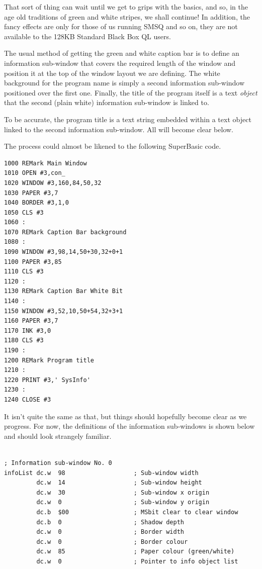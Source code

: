 That sort of thing can wait until we get to grips with the basics, and so, in the
age old traditions of green and white stripes, we shall continue! In addition, the fancy
effects are only for those of us running SMSQ and so on, they are not available to the
128KB Standard Black Box QL users.

The usual method of getting the green and white caption bar is to define an
information sub-{}window that covers the required length of the window and position it at
the top of the window layout we are defining. The white background for the program name is
simply a second information sub-{}window positioned over the first one. Finally, the title
of the program itself is a text \emph{object} that the second (plain white)
information sub-{}window is linked to. 

To be accurate, the program title is a text string embedded within a text object
linked to the second information sub-{}window. All will become clear below.

The process could almost be likened to the following SuperBasic code.

\begin{lstlisting}[firstnumber=1,language={},caption={Pseudo SuperBasic Equivalent},label={lst:PseudoSuperBasicEquivalent}]
1000 REMark Main Window
1010 OPEN #3,con_
1020 WINDOW #3,160,84,50,32
1030 PAPER #3,7
1040 BORDER #3,1,0
1050 CLS #3
1060 :
1070 REMark Caption Bar background
1080 :
1090 WINDOW #3,98,14,50+30,32+0+1
1100 PAPER #3,85
1110 CLS #3
1120 :
1130 REMark Caption Bar White Bit
1140 :
1150 WINDOW #3,52,10,50+54,32+3+1
1160 PAPER #3,7
1170 INK #3,0
1180 CLS #3
1190 :
1200 REMark Program title
1210 :
1220 PRINT #3,' SysInfo'
1230 :
1240 CLOSE #3
\end{lstlisting}

It isn't quite the same as that, but things should hopefully become clear as we
progress. For now, the definitions of the information sub-{}windows is shown below and
should look strangely familiar.

\begin{lstlisting}[firstnumber=48,caption={WMAN Example Window - Information Window 0}]

; Information sub-window No. 0
infoList dc.w  98                   ; Sub-window width
         dc.w  14                   ; Sub-window height
         dc.w  30                   ; Sub-window x origin
         dc.w  0                    ; Sub-window y origin
         dc.b  $00                  ; MSbit clear to clear window
         dc.b  0                    ; Shadow depth 
         dc.w  0                    ; Border width 
         dc.w  0                    ; Border colour
         dc.w  85                   ; Paper colour (green/white)
         dc.w  0                    ; Pointer to info object list
\end{lstlisting}

